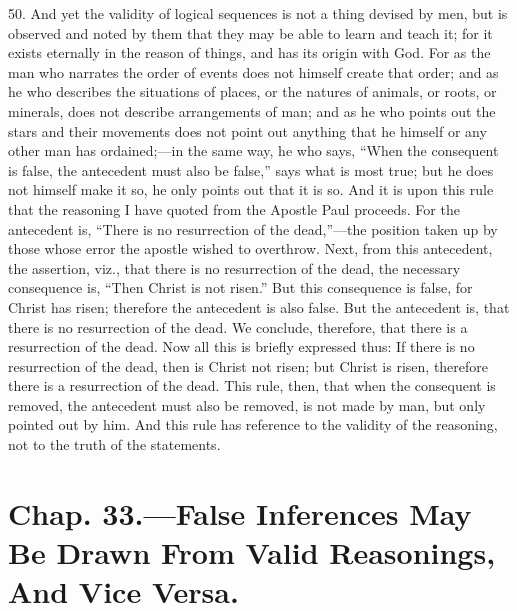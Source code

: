 50. And yet the validity of logical sequences is not a thing devised
by men, but is observed and noted by them that they may be able to
learn and teach it; for it exists eternally in the reason of things,
and has its origin with God. For as the man who narrates the order of
events does not himself create that order; and as he who describes the
situations of places, or the natures of animals, or roots, or
minerals, does not describe arrangements of man; and as he who points
out the stars and their movements does not point out anything that he
himself or any other man has ordained;---in the same way, he who says,
``When the consequent is false, the antecedent must also be false,''
says what is most true; but he does not himself make it so, he only
points out that it is so. And it is upon this rule that the reasoning
I have quoted from the Apostle Paul proceeds. For the antecedent is,
``There is no resurrection of the dead,''---the position taken up by
those whose error the apostle wished to overthrow. Next, from this
antecedent, the assertion, viz., that there is no resurrection of the
dead, the necessary consequence is, ``Then Christ is not risen.'' But
this consequence is false, for Christ has risen; therefore the
antecedent is also false. But the antecedent is, that there is no
resurrection of the dead. We conclude, therefore, that there is a
resurrection of the dead. Now all this is briefly expressed thus: If
there is no resurrection of the dead, then is Christ not risen; but
Christ is risen, therefore there is a resurrection of the dead. This
rule, then, that when the consequent is removed, the antecedent must
also be removed, is not made by man, but only pointed out by him. And
this rule has reference to the validity of the reasoning, not to the
truth of the statements.

\section{Chap. 33.\smaller---False Inferences May Be Drawn From Valid
Reasonings, And Vice Versa.}

